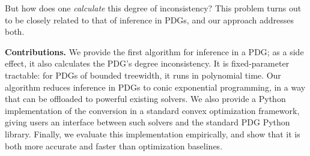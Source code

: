 \documentclass[twoside]{article}
\begin{document}
{%
        But how {does} one \emph{calculate} this degree of inconsistency?
This problem turns out to be closely related to that of
    inference in PDGs, and our approach addresses both.
}



\textbf{Contributions.}
We provide the first algorithm for inference in a PDG;
    as a side effect, it also calculates the PDG's degree inconsistency. 
It is fixed-parameter tractable: for PDGs of bounded treewidth,
it runs in polynomial time.
Our algorithm reduces inference in PDGs to conic exponential programming,
in a way that can be offloaded to powerful existing solvers.
We also provide a Python implementation of the conversion in a
standard convex optimization framework, giving users an
interface between such solvers and the standard PDG Python library.
Finally, we evaluate this implementation empirically, and show that it is both more accurate and faster than optimization baselines.
%
\end{document}
